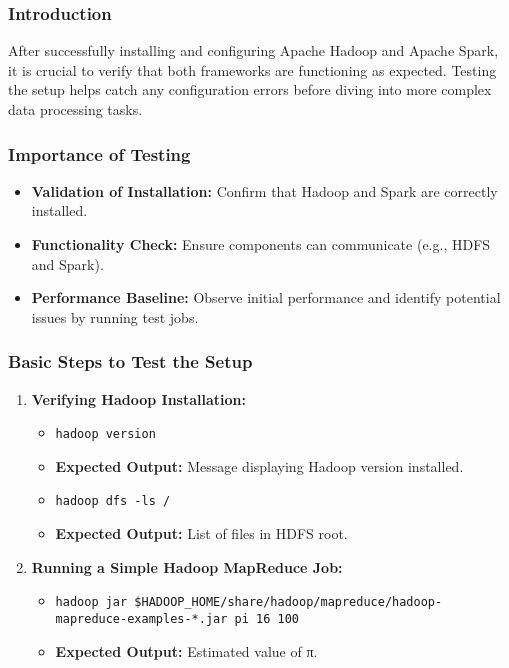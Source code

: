 \documentclass{beamer}
\begin{document}
\begin{frame}
    \frametitle{Introduction}
    After successfully installing and configuring Apache Hadoop and Apache Spark, it is crucial to verify that both frameworks are functioning as expected. 
    Testing the setup helps catch any configuration errors before diving into more complex data processing tasks.
\end{frame}

\begin{frame}
    \frametitle{Importance of Testing}
    \begin{itemize}
        \item \textbf{Validation of Installation:} Confirm that Hadoop and Spark are correctly installed.
        \item \textbf{Functionality Check:} Ensure components can communicate (e.g., HDFS and Spark).
        \item \textbf{Performance Baseline:} Observe initial performance and identify potential issues by running test jobs.
    \end{itemize}
\end{frame}

\begin{frame}[fragile]
    \frametitle{Basic Steps to Test the Setup}
    \begin{enumerate}
        \item \textbf{Verifying Hadoop Installation:}
        \begin{itemize}
            \item \texttt{hadoop version}
            \item \textbf{Expected Output:} Message displaying Hadoop version installed.
            \item \texttt{hadoop dfs -ls /}
            \item \textbf{Expected Output:} List of files in HDFS root.
        \end{itemize}

        \item \textbf{Running a Simple Hadoop MapReduce Job:}
        \begin{itemize}
            \item \texttt{hadoop jar \$HADOOP\_HOME/share/hadoop/mapreduce/hadoop-mapreduce-examples-*.jar pi 16 100}
            \item \textbf{Expected Output:} Estimated value of π.
        \end{itemize}
    \end{enumerate}
\end{frame}
\end{document}
